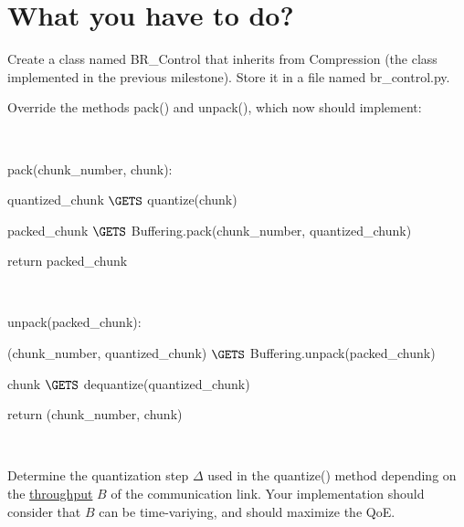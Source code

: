 \section{What you have to do?}

\begin{enumerate}
\item Create a class named BR\_Control that inherits from
  Compression (the class implemented in the previous
  milestone). Store it in a file named br\_control.py.
  
\item Override the methods pack() and unpack(),
  which now should implement:

  \begin{description}
  \item ~
  \item pack(chunk\_number, chunk):
    \begin{description}
    \item quantized\_chunk $\GETS$ quantize(chunk)
    \item packed\_chunk $\GETS$ Buffering.pack(chunk\_number, quantized\_chunk)
    \item return packed\_chunk
    \end{description}
  \item ~
  \item unpack(packed\_chunk):
    \begin{description}
      \item (chunk\_number, quantized\_chunk) $\GETS$ Buffering.unpack(packed\_chunk)
      \item chunk $\GETS$ dequantize(quantized\_chunk)
      \item return (chunk\_number, chunk)
    \end{description}
  \item ~
  \end{description}

\item Determine the quantization step $\Delta$ used in the quantize()
  method depending on the
  \href{https://en.wikipedia.org/wiki/Throughput}{throughput} $B$ of
  the communication link. Your implementation should consider that $B$
  can be time-variying, and should maximize the QoE.

\end{enumerate}

